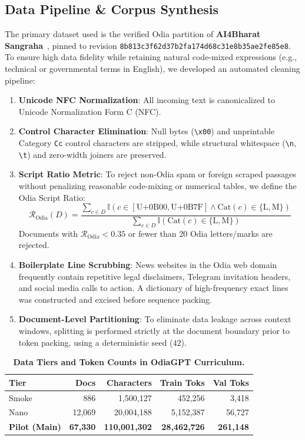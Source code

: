 \documentclass[10pt,twocolumn,letterpaper]{article}
\begin{document}
\subsection{Data Pipeline \& Corpus Synthesis}
The primary dataset used is the verified Odia partition of \textbf{AI4Bharat Sangraha}~\cite{kumar2024sangraha}, pinned to revision \texttt{8b813c3f62d37b2fa174d68c31e8b35ae2fe85e8}. To ensure high data fidelity while retaining natural code-mixed expressions (e.g., technical or governmental terms in English), we developed an automated cleaning pipeline:
\begin{enumerate}
    \item \textbf{Unicode NFC Normalization}: All incoming text is canonicalized to Unicode Normalization Form C (NFC).
    \item \textbf{Control Character Elimination}: Null bytes (\texttt{\textbackslash x00}) and unprintable Category \texttt{Cc} control characters are stripped, while structural whitespace (\texttt{\textbackslash n}, \texttt{\textbackslash t}) and zero-width joiners are preserved.
    \item \textbf{Script Ratio Metric}: To reject non-Odia spam or foreign scraped passages without penalizing reasonable code-mixing or numerical tables, we define the Odia Script Ratio:
    \begin{equation}
    \mathcal{R}_{\text{Odia}}(D) = \frac{\sum_{c \in D} \mathbb{I}(c \in [\text{U+0B00}, \text{U+0B7F}] \land \text{Cat}(c) \in \{\text{L}, \text{M}\})}{\sum_{c \in D} \mathbb{I}(\text{Cat}(c) \in \{\text{L}, \text{M}\})}
    \end{equation}
    Documents with $\mathcal{R}_{\text{Odia}} < 0.35$ or fewer than 20 Odia letters/marks are rejected.
    \item \textbf{Boilerplate Line Scrubbing}: News websites in the Odia web domain frequently contain repetitive legal disclaimers, Telegram invitation headers, and social media calls to action. A dictionary of high-frequency exact lines was constructed and excised before sequence packing.
    \item \textbf{Document-Level Partitioning}: To eliminate data leakage across context windows, splitting is performed strictly at the document boundary prior to token packing, using a deterministic seed ($42$).
\end{enumerate}

\begin{table}[h]
\centering
\small
\caption{\textbf{Data Tiers and Token Counts in OdiaGPT Curriculum.}}
\label{tab:data_tiers}
\begin{tabularx}{\columnwidth}{lrrrr}
\toprule
\textbf{Tier} & \textbf{Docs} & \textbf{Characters} & \textbf{Train Toks} & \textbf{Val Toks} \\
\midrule
Smoke & 886 & 1,500,127 & 452,256 & 3,418 \\
Nano & 12,069 & 20,004,188 & 5,152,387 & 56,727 \\
\textbf{Pilot (Main)} & \textbf{67,330} & \textbf{110,001,302} & \textbf{28,462,726} & \textbf{261,148} \\
\bottomrule
\end{tabularx}
\end{table}
\end{document}
